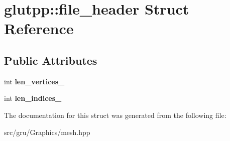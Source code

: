 \hypertarget{structglutpp_1_1file__header}{\section{glutpp\-:\-:file\-\_\-header \-Struct \-Reference}
\label{structglutpp_1_1file__header}
}
\subsection*{\-Public \-Attributes}
\begin{DoxyCompactItemize}
\item 
\hypertarget{structglutpp_1_1file__header_a1c927bc499e200233b20384922dd5f38}{int {\bfseries len\-\_\-vertices\-\_\-}}\label{structglutpp_1_1file__header_a1c927bc499e200233b20384922dd5f38}

\item 
\hypertarget{structglutpp_1_1file__header_adce5b53008586e16c7185c7846a9d153}{int {\bfseries len\-\_\-indices\-\_\-}}\label{structglutpp_1_1file__header_adce5b53008586e16c7185c7846a9d153}

\end{DoxyCompactItemize}


\-The documentation for this struct was generated from the following file\-:\begin{DoxyCompactItemize}
\item 
src/gru/\-Graphics/mesh.\-hpp\end{DoxyCompactItemize}
